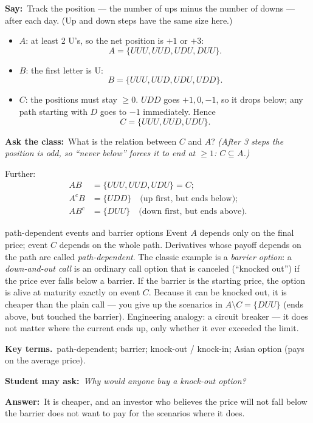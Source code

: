 \documentclass[11pt,a4paper,parskip=half]{scrartcl}
\newcommand{\terms}{\par\textbf{\color{plum}Key terms.}\ }
\newcommand{\sq}[1]{\par\textbf{\color{plum}Student may ask:}\ \emph{#1}\par}
\newcommand{\ans}{\textbf{Answer:}\ }
\newcommand{\say}{\textbf{\color{teal}Say:}\ }
\newcommand{\ask}{\textbf{\color{navy}Ask the class:}\ }
\begin{document}

\say Track the position --- the number of ups minus the number of downs ---
after each day. (Up and down steps have the same size here.)

\begin{itemize}
	\item $A$: at least 2 U's, so the net position is $+1$ or $+3$:
	      \[ A = \{UUU,UUD,UDU,DUU\}. \]
	\item $B$: the first letter is U:
	      \[ B = \{UUU,UUD,UDU,UDD\}. \]
	\item $C$: the positions must stay $\ge 0$. $UDD$ goes $+1,0,-1$, so it
	      drops below; any path starting with $D$ goes to $-1$ immediately.
	      Hence
	      \[ C = \{UUU,UUD,UDU\}. \]
\end{itemize}

\ask What is the relation between $C$ and $A$? \emph{(After 3 steps the
	position is odd, so ``never below'' forces it to end at $\ge1$: $C\subseteq
		A$.)}

Further:
\[ \begin{aligned}
		AB   & = \{UUU,UUD,UDU\} = C;                          \\
		A^cB & = \{UDD\}\quad\text{(up first, but ends below)};   \\
		AB^c & = \{DUU\}\quad\text{(down first, but ends above)}.
	\end{aligned} \]

\begin{bg}{path-dependent events and barrier options}
	Event $A$ depends only on the final price; event $C$ depends on the whole
	path. Derivatives whose payoff depends on the path are called
	\emph{path-dependent}. The classic example is a \emph{barrier option}: a
	\emph{down-and-out call} is an ordinary call option that is canceled
	(``knocked out'') if the price ever falls below a barrier. If the barrier
	is the starting price, the option is alive at maturity exactly on event $C$.
	Because it can be knocked out, it is cheaper than the plain call --- you
	give up the scenarios in $A\setminus C=\{DUU\}$ (ends above, but touched the
	barrier). Engineering analogy: a circuit breaker --- it does not matter
	where the current ends up, only whether it ever exceeded the limit.

	\terms path-dependent; barrier; knock-out / knock-in; Asian option (pays
	on the average price).

	\sq{Why would anyone buy a knock-out option?}
	\ans It is cheaper, and an investor who believes the price will not fall
	below the barrier does not want to pay for the scenarios where it does.
\end{bg}
\end{document}
